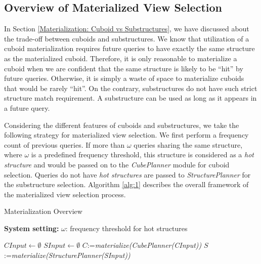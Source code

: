 \subsection{Overview of Materialized View Selection}
\label{Overview of Materialization Part}
In Section \ref{Materialization: Cuboid vs Substructures}, we have discussed about the trade-off between cuboids and substructures. We know that utilization of a cuboid materialization requires future queries to have exactly the same structure as the materialized cuboid. Therefore, it is only reasonable to materialize a cuboid %
when we are confident that the same structure is likely to be ``hit'' by future queries. Otherwise, it is simply a waste of space to materialize cuboids that would be rarely ``hit''. On the contrary, substructures do not have such strict structure match requirement. A substructure can be used as long as it appears in a future query.

Considering the different features of cuboids and substructures, we take the following strategy for materialized view selection.
We first perform a frequency count of previous queries. If more than $\omega$ queries sharing the same structure, where $\omega$ is a predefined frequency threshold, this structure is considered as a \emph{hot structure} and would be passed on to the \emph{CubePlanner} module for cuboid selection. Queries do not have \emph{hot structures} are passed to \emph{StructurePlanner} for the substructure selection. Algorithm \ref{alg:1} describes the overall framework of the materialized view selection process.

\begin{algorithm}[H]
	\label{alg:1}
	\caption{Materialization Overview}
	\LinesNumbered
	\textbf{System setting:} $\omega$: frequency threshold for hot structures\\
	
	$CInput \gets \emptyset$\;
	$SInput \gets \emptyset$\;
	$C$:=\emph{materialize(CubePlanner(CInput))}\;
	$S$:=\emph{materialize(StructurePlanner(SInput))}\;
	\label{alg:PartialMaterialization}
\end{algorithm}

